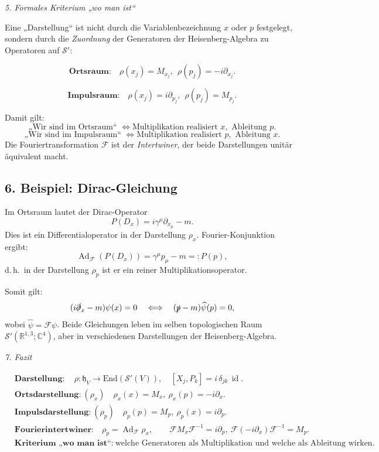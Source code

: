 \documentclass[10pt, letterpaper]{article}
\newcommand{\id}{\operatorname{id}}
\newcommand{\Ad}{\operatorname{Ad}}
\newcommand{\R}{\mathbb{R}}
\newcommand{\C}{\mathbb{C}}
\newcommand{\End}{\mathrm{End}}
\begin{document}
\emph{5. Formales Kriterium „wo man ist“}

Eine „Darstellung“ ist nicht durch die Variablenbezeichnung $x$ oder $p$ festgelegt,
sondern durch die \emph{Zuordnung} der Generatoren der Heisenberg-Algebra zu Operatoren auf $\mathcal{S}'$:

\[
\textbf{Ortsraum:}\quad
\rho(x_j)=M_{x_j},\ \ \rho(p_j)=-i\partial_{x_j}.
\]

\[
\textbf{Impulsraum:}\quad
\rho(x_j)=i\partial_{p_j},\ \ \rho(p_j)=M_{p_j}.
\]

Damit gilt:
\[
\text{„Wir sind im Ortsraum“ } \iff \text{Multiplikation realisiert }x,\text{ Ableitung }p.
\]
\[
\text{„Wir sind im Impulsraum“ } \iff \text{Multiplikation realisiert }p,\text{ Ableitung }x.
\]
Die Fouriertransformation $\mathcal{F}$ ist der \emph{Intertwiner}, der beide Darstellungen unitär äquivalent macht.

\subsection*{6. Beispiel: Dirac-Gleichung}

Im Ortsraum lautet der Dirac-Operator
\[
P(D_x)=i\gamma^\mu \partial_{x_\mu}-m.
\]
Dies ist ein Differentialoperator in der Darstellung $\rho_x$.  
Fourier-Konjunktion ergibt:
\[
\Ad_{\mathcal{F}}(P(D_x))=\gamma^\mu p_\mu - m =: P(p),
\]
d.\,h.\ in der Darstellung $\rho_p$ ist er ein reiner Multiplikationsoperator.

Somit gilt:
\[
(i\slashed{\partial}_x - m)\psi(x)=0
\quad\Longleftrightarrow\quad
(\slashed{p}-m)\widehat{\psi}(p)=0,
\]
wobei $\widehat{\psi}=\mathcal{F}\psi$.
Beide Gleichungen leben im selben topologischen Raum $\mathcal{S}'(\R^{1,3};\C^4)$,
aber in verschiedenen Darstellungen der Heisenberg-Algebra.

\emph{7. Fazit}

\begin{tcolorbox}[colback=gray!10,sharp corners]
\begin{align*}
&\textbf{Darstellung}:\quad \rho:\mathfrak{h}_V\to \End(\mathcal{S}'(V)),\quad
[X_j,P_k]=i\,\delta_{jk}\,\id.\\[2mm]
&\textbf{Ortsdarstellung:}\ (\rho_x)\quad
\rho_x(x)=M_x,\ \rho_x(p)=-i\partial_x.\\[1mm]
&\textbf{Impulsdarstellung:}\ (\rho_p)\quad
\rho_p(p)=M_p,\ \rho_p(x)=i\partial_p.\\[1mm]
&\textbf{Fourierintertwiner:}\quad
\rho_p = \Ad_{\mathcal{F}}\rho_x,\qquad
\mathcal{F}M_x\mathcal{F}^{-1}=i\partial_p,\ 
\mathcal{F}(-i\partial_x)\mathcal{F}^{-1}=M_p.\\[2mm]
&\textbf{Kriterium „wo man ist“:}\ 
\text{welche Generatoren als Multiplikation und welche als Ableitung wirken.}
\end{align*}
\end{tcolorbox}
\end{document}
